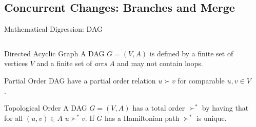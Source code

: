 \documentclass[xetex, handout]{beamer}
\begin{document}
\subsection{Concurrent Changes: Branches and Merge}

\begin{frame}[fragile]{Mathematical Digression: DAG}
  \begin{columns}
    \begin{column}{.55\linewidth}
      \begin{block}{Directed Acyclic Graph}
        A DAG $G = (V,A)$ is defined by a finite set of vertices $V$ and a
        finite set of \emph{arcs} $A$ and may not contain loops.
      \end{block}

      \begin{block}{Partial Order}
        DAG have a partial order relation $u \succ v$ for comparable $u,v \in V$.
      \end{block}

      \begin{alertblock}{Topological Order}
        A DAG $G = (V,A)$ has a total order $\succ^*$ by having that for all
        $(u, v) \in A$ $u \succ^* v$. If $G$ has a Hamiltonian path
        $\succ^*$
        is unique.
      \end{alertblock}
    \end{column}
    \begin{column}{.45\linewidth}
\end{column}
\end{columns}
\end{frame}
\end{document}
